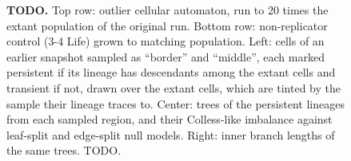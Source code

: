\begin{figure}
\caption{%
\textbf{TODO.}
\footnotesize
Top row: outlier cellular automaton, run to 20 times the extant population of the original run.
Bottom row: non-replicator control (3-4 Life) grown to matching population.
Left: cells of an earlier snapshot sampled as ``border'' and ``middle'', each marked persistent if its lineage has descendants among the extant cells and transient if not, drawn over the extant cells, which are tinted by the sample their lineage traces to.
Center: trees of the persistent lineages from each sampled region, and their Colless-like imbalance against leaf-split and edge-split null models.
Right: inner branch lengths of the same trees.
TODO.
}
\label{fig:use-case-outlier}
\end{figure}
